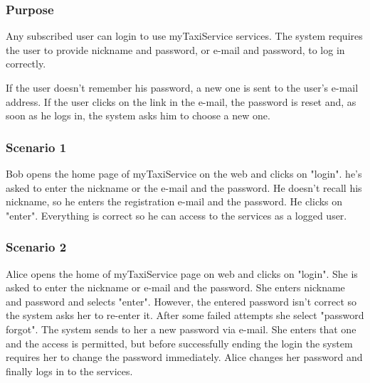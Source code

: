 \label{user-login}
\subsubsection{Purpose}
Any subscribed user can login to use myTaxiService services.
The system requires the user to provide nickname and password, or e-mail and password, to log in correctly.

If the user doesn't remember his password, a new one is sent to the user's e-mail address. If the user clicks on the link in the e-mail, the password is reset and, as soon as he logs in, the system asks him to choose a new one. 

\subsubsection{Scenario 1}
Bob opens the home page of myTaxiService on the web and clicks on "login". 
he's asked to enter the nickname or the e-mail and the password. He doesn't recall his nickname, so he enters the registration e-mail and the password. He clicks on "enter". 
Everything is correct so he can access to the services as a logged user.

\subsubsection{Scenario 2}
Alice opens the home of myTaxiService page on web and clicks on "login".  
She is asked to enter the nickname or e-mail and the password.
She enters nickname and password and selects "enter". However, the entered password isn't correct so the system asks her to re-enter it. 
After some failed attempts she select "password forgot".
The system sends to her a new password via e-mail. She enters that one and the access is permitted, but before successfully ending the login the system requires her to change the password immediately. 
Alice changes her password and finally logs in to the services.

